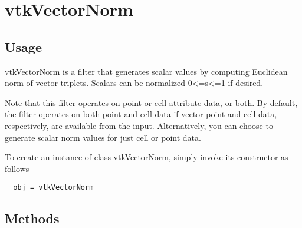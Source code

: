\section{vtkVectorNorm}

\subsection{Usage}

 vtkVectorNorm is a filter that generates scalar values by computing
 Euclidean norm of vector triplets. Scalars can be normalized 
 0<=s<=1 if desired.

 Note that this filter operates on point or cell attribute data, or
 both.  By default, the filter operates on both point and cell data
 if vector point and cell data, respectively, are available from the
 input. Alternatively, you can choose to generate scalar norm values
 for just cell or point data.

To create an instance of class vtkVectorNorm, simply
invoke its constructor as follows
\begin{verbatim}
  obj = vtkVectorNorm
\end{verbatim}
\subsection{Methods}

